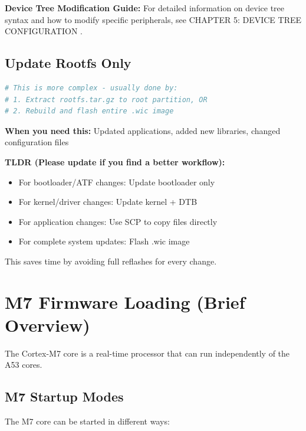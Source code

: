 \documentclass[12pt,a4paper]{report}
\begin{document}
\begin{docref}
\textbf{Device Tree Modification Guide:} For detailed information on device tree syntax and how to modify specific peripherals, see CHAPTER 5: DEVICE TREE CONFIGURATION .
\end{docref}


\subsection{Update Rootfs Only}

\begin{lstlisting}[language=bash]
# This is more complex - usually done by:
# 1. Extract rootfs.tar.gz to root partition, OR
# 2. Rebuild and flash entire .wic image

\end{lstlisting}

\textbf{When you need this:} Updated applications, added new libraries, changed configuration files

\begin{important}
\textbf{TLDR (Please update if you find a better workflow):}
\begin{itemize}
    \item For bootloader/ATF changes: Update bootloader only
    \item For kernel/driver changes: Update kernel + DTB
    \item For application changes: Use SCP to copy files directly
    \item For complete system updates: Flash .wic image
\end{itemize}

This saves time by avoiding full reflashes for every change.
\end{important}



\pagebreak
\section{M7 Firmware Loading (Brief Overview)}

The Cortex-M7 core is a real-time processor that can run independently of the A53 cores.

\subsection{M7 Startup Modes}

The M7 core can be started in different ways:
\end{document}
